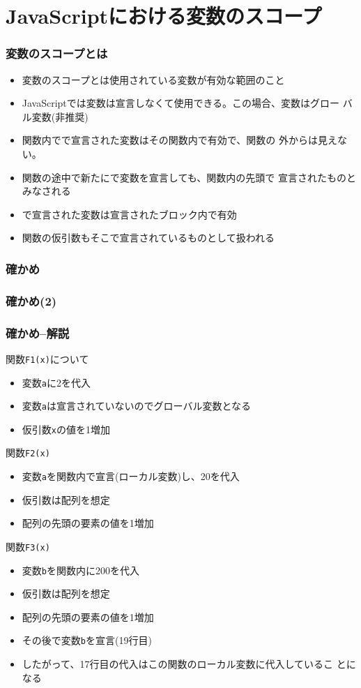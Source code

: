 

\frame{\maketitle}
\section{JavaScriptにおける変数のスコープ}
\begin{frame}[containsverbatim]
 \frametitle{変数のスコープとは}
 \begin{itemize}
  \item 変数のスコープとは使用されている変数が有効な範囲のこと
  \item JavaScriptでは変数は宣言しなくて使用できる。この場合、変数はグロー
        バル変数(非推奨)
  \item 関数内でで宣言された変数はその関数内で有効で、関数の
        外からは見えない。
  \item 関数の途中で新たにで変数を宣言しても、関数内の先頭で
        宣言されたものとみなされる
  \item {}で宣言された変数は宣言されたブロック内で有効
  \item 関数の仮引数もそこで宣言されているものとして扱われる
 \end{itemize}
\end{frame}
\begin{frame}[containsverbatim]
 \frametitle{確かめ}
\end{frame}
\begin{frame}[containsverbatim]
 \frametitle{確かめ(2)}
\end{frame}
\begin{frame}[containsverbatim]
 \frametitle{確かめ--解説}
 関数\texttt{F1(x)}について
\begin{itemize}
 \item 変数\texttt{a}に2を代入
 \item 変数\texttt{a}は宣言されていないのでグローバル変数となる
 \item 仮引数\texttt{x}の値を1増加
\end{itemize}
 関数\texttt{F2(x)}
 \begin{itemize}
	\item 変数\texttt{a}を関数内で宣言(ローカル変数)し、20を代入
	\item 仮引数は配列を想定
	\item 配列の先頭の要素の値を1増加
 \end{itemize}
 関数\texttt{F3(x)}
 \begin{itemize}
	\item 変数\texttt{b}を関数内に200を代入
	\item 仮引数は配列を想定
	\item 配列の先頭の要素の値を1増加
	\item その後で変数\texttt{b}を宣言(19行目)
	\item したがって、17行目の代入はこの関数のローカル変数に代入しているこ
				とになる
 \end{itemize}
\end{frame}
